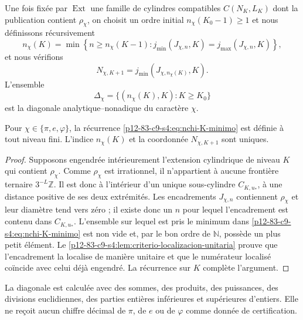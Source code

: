\begin{definition}
\label{p12-83-c9-s4:def:recurrencia-diagonal-constantes}
Une fois fixée par \(\operatorname{Ext}\) une famille de cylindres compatibles
\(C(N_K,L_K)\) dont la publication contient \(\rho_\chi\), on choisit un ordre
initial \(n_\chi(K_0-1)\geq1\) et nous définissons récursivement
\begin{equation}
 n_\chi(K)=
 \min\left\{
 n\geq n_\chi(K-1):
 j_{\min}(J_{\chi,n},K)=j_{\max}(J_{\chi,n},K)
 \right\},
 \label{p12-83-c9-s4:eq:nchi-K-minimo}
\end{equation}
et nous vérifions
\begin{equation}
 N_{\chi,K+1}
 =j_{\min}(J_{\chi,n_\chi(K)},K).
 \label{p12-83-c9-s4:eq:Nchi-K-mas-uno}
\end{equation}
L’ensemble
\[
 \Delta_\chi=
 \{(n_\chi(K),K):K\geq K_0\}
\]
est la diagonale analytique--nonadique du caractère \(\chi\).
\end{definition}

\begin{theorem}
\label{p12-83-c9-s4:thm:existencia-unicidad-diagonal}
Pour \(\chi\in\{\pi,e,\varphi\}\), la récurrence
\eqref{p12-83-c9-s4:eq:nchi-K-minimo} est définie à tout niveau fini. L’indice
\(n_\chi(K)\) et la coordonnée \(N_{\chi,K+1}\) sont uniques.
\end{theorem}

\begin{proof}
Supposons engendrée intérieurement l’extension cylindrique de niveau \(K\) qui contient
\(\rho_\chi\). Comme \(\rho_\chi\) est irrationnel, il n’appartient à aucune
frontière ternaire \(3^{-L}\mathbb Z\). Il est donc à l’intérieur d’un
unique sous-cylindre \(C_{K,u_*}\), à une distance positive de ses deux extrémités.
Les encadrements \(J_{\chi,n}\) contiennent \(\rho_\chi\) et leur diamètre
tend vers zéro ; il existe donc un \(n\) pour lequel l’encadrement est
contenu dans \(C_{K,u_*}\). L’ensemble sur lequel est pris le minimum dans
\eqref{p12-83-c9-s4:eq:nchi-K-minimo} est non vide et, par le bon ordre de
\(\mathbb N\), possède un plus petit élément. Le
\cref{p12-83-c9-s4:lem:criterio-localizacion-unitaria} prouve que l’encadrement la
localise de manière unitaire et que le numérateur localisé coïncide avec celui déjà
engendré. La récurrence sur \(K\) complète l’argument.
\end{proof}

\begin{corollary}
La diagonale est calculée avec des sommes, des produits, des puissances, des divisions euclidiennes,
des parties entières inférieures et supérieures d’entiers. Elle ne reçoit aucun chiffre décimal de \(\pi\), de \(e\) ou de
\(\varphi\) comme donnée de certification.
\end{corollary}

